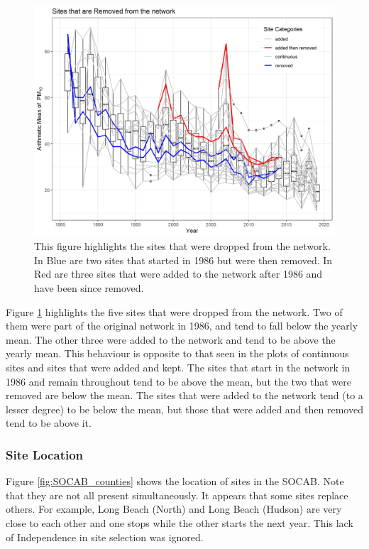 \documentclass{article}
\begin{document}
\begin{figure}[ht]
	\centering
	\includegraphics[width = \textwidth]{Figures/site_timing_trace-Removed.png}
	\caption{This figure highlights the sites that were dropped from the network.  In Blue are two sites that started in 1986 but were then removed.  In Red are three sites that were added to the network after 1986 and have been since removed.  }
	\label{fig:site_timing_trace-Removed}
\end{figure}
Figure  \ref{fig:site_timing_trace-Removed} highlights the five sites that were dropped from the network.  Two of them were part of the original network in 1986, and tend to fall below the yearly mean.   The other three were added to the network and tend to be above the yearly mean.  This behaviour is opposite to that seen in the plots of continuous sites and sites that were added and kept.  The sites that start in the network in 1986 and remain throughout tend to be above the mean, but the two that were removed are below the mean.  The sites that were added to the network tend (to a lesser degree) to be below the mean, but those that were added and then removed tend to be above it.

\subsubsection*{Site Location}
\label{subsubsec:sitelocn}
Figure  \ref{fig:SOCAB_counties} shows the location of sites in the \ac{SOCAB}.  Note that they are not all present simultaneously.  
It appears that some sites replace others.  For example, Long Beach (North) and Long Beach (Hudson) are very close to each other and one stops while the other starts the next year.  This lack of Independence in site selection was ignored.
\end{document}
